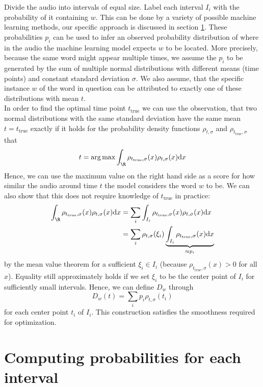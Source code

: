 Divide the audio into intervals of equal size. Label each interval $I_i$ with the probability of it containing $w$. This can be done by a variety of possible machine learning methods, our specific approach is discussed in section \ref{interval_word_prob}. These probabilities $p_i$ can be used to infer an observed probability distribution of where in the audio the machine learning model expects $w$ to be located. More precisely, because the same word might appear multiple times, we assume the $p_i$ to be generated by the sum of multiple normal distributions with different means (time points) and constant standard deviation $\sigma$. We also assume, that the specific instance $w$ of the word in question can be attributed to exactly one of these distributions with mean $t$.\\
In order to find the optimal time point $t_\text{true}$ we can use the observation, that two normal distributions with the same standard deviation have the same mean $t=t_\text{true}$ exactly if it holds for the probability density functions $\rho_{t,\sigma}$ and $\rho_{t_\text{true},\sigma}$ that
\[t = \arg\max \int_\R \rho_{t_\text{true},\sigma}(x)\rho_{t,\sigma}(x)\text{d}x\]
Hence, we can use the maximum value on the right hand side as a score for how similar the audio around time $t$ the model considers the word $w$ to be. We can also show that this does not require knowledge of $t_\text{true}$ in practice:
\begin{align*}
	\int_\R \rho_{t_\text{true},\sigma}(x)\rho_{t,\sigma}(x)\text{d}x &= \sum_{i} \int_{I_i} \rho_{t_\text{true},\sigma}(x)\rho_{t,\sigma}(x)\text{d}x\\
			&= \sum_i \rho_{t,\sigma}(\xi_i) \underbrace{\int_{I_i} \rho_{t_\text{true},\sigma}(x)\text{d}x}_{\approx p_i}
\end{align*}
by the mean value theorem for a sufficient $\xi_i\in I_i$ (because $\rho_{t_\text{true},\sigma}(x) > 0$ for all $x$). Equality still approximately holds if we set $\xi_i$ to be the center point of $I_i$ for sufficiently small intervals.
Hence, we can define $D_w$ through
\[
	D_w(t) = \sum_i p_i \rho_{t,\sigma}(t_i)
\]
for each center point $t_i$ of $I_i$. This construction satisfies the smoothness required for optimization.

\section{Computing probabilities for each interval}
\label{interval_word_prob}

